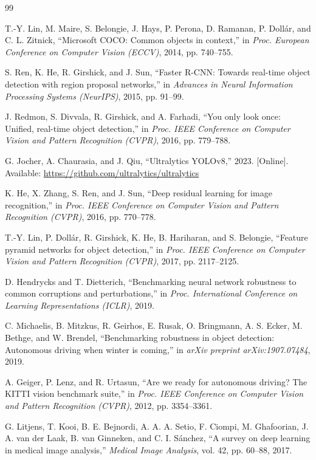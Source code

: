 \documentclass[conference]{IEEEtran}
\begin{document}
\begin{thebibliography}{99}

T.-Y. Lin, M. Maire, S. Belongie, J. Hays, P. Perona, D. Ramanan, P. Dollár, and C. L. Zitnick, ``Microsoft COCO: Common objects in context,'' in \textit{Proc. European Conference on Computer Vision (ECCV)}, 2014, pp. 740--755.

S. Ren, K. He, R. Girshick, and J. Sun, ``Faster R-CNN: Towards real-time object detection with region proposal networks,'' in \textit{Advances in Neural Information Processing Systems (NeurIPS)}, 2015, pp. 91--99.

J. Redmon, S. Divvala, R. Girshick, and A. Farhadi, ``You only look once: Unified, real-time object detection,'' in \textit{Proc. IEEE Conference on Computer Vision and Pattern Recognition (CVPR)}, 2016, pp. 779--788.

G. Jocher, A. Chaurasia, and J. Qiu, ``Ultralytics YOLOv8,'' 2023. [Online]. Available: \url{https://github.com/ultralytics/ultralytics}

K. He, X. Zhang, S. Ren, and J. Sun, ``Deep residual learning for image recognition,'' in \textit{Proc. IEEE Conference on Computer Vision and Pattern Recognition (CVPR)}, 2016, pp. 770--778.

T.-Y. Lin, P. Dollár, R. Girshick, K. He, B. Hariharan, and S. Belongie, ``Feature pyramid networks for object detection,'' in \textit{Proc. IEEE Conference on Computer Vision and Pattern Recognition (CVPR)}, 2017, pp. 2117--2125.

D. Hendrycks and T. Dietterich, ``Benchmarking neural network robustness to common corruptions and perturbations,'' in \textit{Proc. International Conference on Learning Representations (ICLR)}, 2019.

C. Michaelis, B. Mitzkus, R. Geirhos, E. Rusak, O. Bringmann, A. S. Ecker, M. Bethge, and W. Brendel, ``Benchmarking robustness in object detection: Autonomous driving when winter is coming,'' in \textit{arXiv preprint arXiv:1907.07484}, 2019.

A. Geiger, P. Lenz, and R. Urtasun, ``Are we ready for autonomous driving? The KITTI vision benchmark suite,'' in \textit{Proc. IEEE Conference on Computer Vision and Pattern Recognition (CVPR)}, 2012, pp. 3354--3361.

G. Litjens, T. Kooi, B. E. Bejnordi, A. A. A. Setio, F. Ciompi, M. Ghafoorian, J. A. van der Laak, B. van Ginneken, and C. I. Sánchez, ``A survey on deep learning in medical image analysis,'' \textit{Medical Image Analysis}, vol. 42, pp. 60--88, 2017.


\end{thebibliography}
\end{document}
